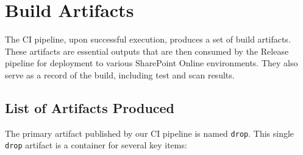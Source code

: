 \chapter{Build Artifacts}
\label{chapter:BuildArtifacts}

The CI pipeline, upon successful execution, produces a set of build artifacts. These artifacts are essential outputs that are then consumed by the Release pipeline for deployment to various SharePoint Online environments. They also serve as a record of the build, including test and scan results.

\section{List of Artifacts Produced}
\label{sec:ListOfArtifacts}

The primary artifact published by our CI pipeline is named \texttt{drop}. This single \texttt{drop} artifact is a container for several key items:

